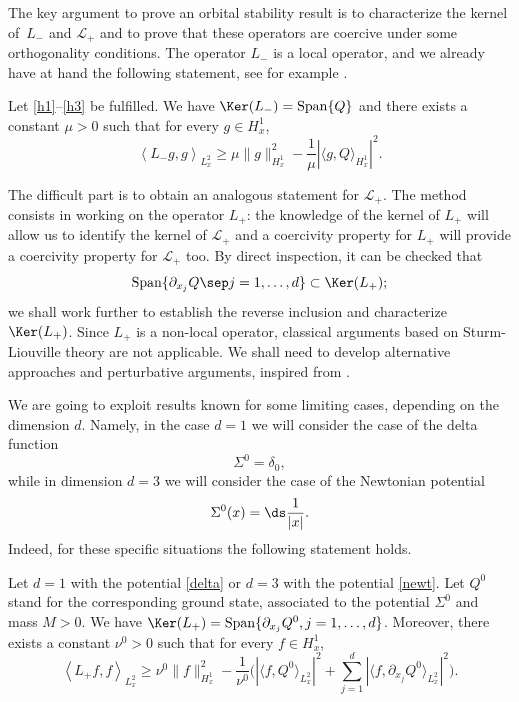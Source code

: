 The key argument to prove an orbital stability result is to characterize the kernel of~$L_{-}$ and $\mathcal{L}_{+}$ and to prove that these operators are coercive under some orthogonality conditions. The operator $L_{-}$ is a local operator, and we already
have at hand the following statement,
see for example \cite{Weinstein1}.

\begin{lemma}\label{Lemma_L-}
Let \eqref{h1}--\eqref{h3} be fulfilled. We have $\Ker(L_{-})=\mathrm{Span}\{Q\}$ and there exists a constant $\mu>0$ such that for every $g\in H_{x}^{1}$,
\begin{equation}\label{coercivity1}
\left\langle L_{-}g,g\right\rangle_{L_{x}^{2}}\geq\mu\|g\|_{H_{x}^{1}}^{2}-\frac{1}{\mu}\left|\langle g,Q\rangle_{H_{x}^{1}}\right|^{2}.
\end{equation}
\end{lemma}

The difficult part is to obtain an analogous statement for $\mathcal{L}_{+}$.
The method consists in working on the operator $L_{+}$: the knowledge of the kernel of $L_{+}$ will allow us to identify the kernel of $\mathcal{L}_{+}$ and a coercivity property for $L_{+}$ will provide a coercivity property for $\mathcal{L}_{+}$ too.
By direct inspection, it can be checked that
\[
\mathrm{Span}\{\partial_{x_{j}}Q\sep j=1,\ldots,d\} \subset \Ker (L_{+});
\]
we shall work further to establish the reverse inclusion and characterize $\Ker (L_{+})$. Since $L_{+}$ is a non-local operator, classical arguments based on Sturm-Liouville theory are not applicable. We shall need to develop alternative approaches and perturbative arguments, inspired from \cite{Lenzmann}.

We are going to exploit results known for some limiting cases, depending on the dimension $d$. Namely, in the case $d=1$ we will consider the case of the delta function
\begin{equation}\label{delta}
\Sigma^{0}=\delta_{0},
\end{equation}
while in dimension $d=3$ we will consider the case of the Newtonian potential
\begin{equation}\label{newt}\Sigma^0(x)=\ds\frac{1}{|x|}.
\end{equation}
Indeed, for these specific situations the following statement holds.
\begin{lemma}\label{Lemma_L+}

Let $d=1$ with the potential \eqref{delta} or $d=3$ with the potential \eqref{newt}.
Let $Q^0$ stand for the corresponding ground state, associated to the potential $\Sigma^0$ and mass $M>0$.
We have
$\Ker(L_{+})=\mathrm{Span}\{\partial_{x_{j}}Q^0,j=1,\ldots,d\}$. Moreover, there exists a constant $\nu^0>0$ such that for every $f\in H_{x}^{1}$,
\begin{equation}\label{coercivity2}
\left\langle L_{+}f,f\right\rangle_{L_{x}^{2}}\geq\nu^0\|f\|_{H_{x}^{1}}^{2}-\frac{1}{\nu^0}\biggl(\left|\langle f,Q^0\rangle_{L_{x}^{2}}\right|^{2}+\sum\limits_{j=1}^{d}\left|\langle f,\partial_{x_{j}}Q^0\rangle_{L_{x}^{2}}\right|^{2}\biggr).
\end{equation}
\end{lemma}

